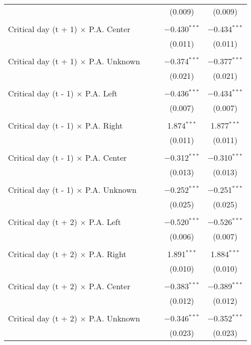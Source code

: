 \documentclass[
]{article}
\begin{document}
\begin{table}[!htbp]
{\begin{tabular}{@{\extracolsep{5pt}}lcccc}
  &  &  & (0.009) & (0.009) \\ 
  & & & & \\ 
 Critical day (t + 1) $\times$ P.A. Center &  &  & $-$0.430$^{***}$ & $-$0.434$^{***}$ \\ 
  &  &  & (0.011) & (0.011) \\ 
  & & & & \\ 
 Critical day (t + 1) $\times$ P.A. Unknown &  &  & $-$0.374$^{***}$ & $-$0.377$^{***}$ \\ 
  &  &  & (0.021) & (0.021) \\ 
  & & & & \\ 
 Critical day (t - 1) $\times$ P.A. Left &  &  & $-$0.436$^{***}$ & $-$0.434$^{***}$ \\ 
  &  &  & (0.007) & (0.007) \\ 
  & & & & \\ 
 Critical day (t - 1) $\times$ P.A. Right &  &  & 1.874$^{***}$ & 1.877$^{***}$ \\ 
  &  &  & (0.011) & (0.011) \\ 
  & & & & \\ 
 Critical day (t - 1) $\times$ P.A. Center &  &  & $-$0.312$^{***}$ & $-$0.310$^{***}$ \\ 
  &  &  & (0.013) & (0.013) \\ 
  & & & & \\ 
 Critical day (t - 1) $\times$ P.A. Unknown &  &  & $-$0.252$^{***}$ & $-$0.251$^{***}$ \\ 
  &  &  & (0.025) & (0.025) \\ 
  & & & & \\ 
 Critical day (t + 2) $\times$ P.A. Left &  &  & $-$0.520$^{***}$ & $-$0.526$^{***}$ \\ 
  &  &  & (0.006) & (0.007) \\ 
  & & & & \\ 
 Critical day (t + 2) $\times$ P.A. Right &  &  & 1.891$^{***}$ & 1.884$^{***}$ \\ 
  &  &  & (0.010) & (0.010) \\ 
  & & & & \\ 
 Critical day (t + 2) $\times$ P.A. Center &  &  & $-$0.383$^{***}$ & $-$0.389$^{***}$ \\ 
  &  &  & (0.012) & (0.012) \\ 
  & & & & \\ 
 Critical day (t + 2) $\times$ P.A. Unknown &  &  & $-$0.346$^{***}$ & $-$0.352$^{***}$ \\ 
  &  &  & (0.023) & (0.023) \\ 

\end{tabular}}
\end{table}
\end{document}
